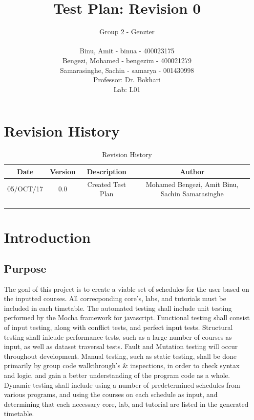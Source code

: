 \documentclass[11pt, oneside]{article}   	%
\title{Test Plan: Revision 0}
\author{Group 2 - Genzter \\
		\\ Binu, Amit - binua - 400023175
		\\ Bengezi, Mohamed - bengezim - 400021279
		\\ Samarasinghe, Sachin - samarya - 001430998
		\\Professor: Dr. Bokhari
		\\ Lab: L01}
\begin{document}
\maketitle

\newpage
\section{Revision History}

\begin{table}[h]
\begin{center}
\begin{tabular}{ | c | c | c | c | }
\hline
 Date & Version & Description & Author \\ 
\hline
 05/OCT/17 & 0.0 & Created Test Plan & Mohamed Bengezi, Amit Binu, Sachin Samarasinghe \\  
\hline
  & & & \\
\hline
 & & & \\
\hline 
 & & & \\ 
\hline 
\end{tabular}
\end{center}
\caption{Revision History}
\end{table}

\newpage
\tableofcontents
\listoffigures
\listoftables

\newpage
\section{Introduction}
\subsection{Purpose}
The goal of this project is to create a viable set of schedules for the user based on the inputted courses. All correcponding core's, labs, and tutorials must be included in each timetable. The automated testing shall include unit testing performed by the Mocha framework for javascript. Functional testing shall consist of input testing, along with conflict tests, and perfect input tests. Structural testing shall inlcude performance tests, such as a large number of courses as input, as well as dataset traversal tests. Fault and Mutation testing will occur throughout development. Manual testing, such as static testing, shall be done primarily by group code walkthrough's \& inspections, in order to check syntax and logic, and gain a better understanding of the program code as a whole. Dynamic testing shall include using a number of predetermined schedules from various programs, and using the courses on each schedule as input, and determining that each necessary core, lab, and tutorial are listed in the generated timetable. 
\end{document}
